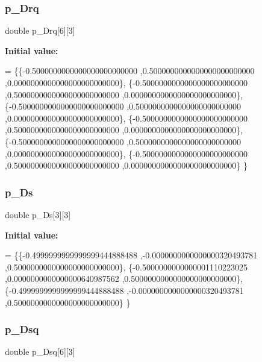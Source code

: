 \subsubsection{\texorpdfstring{p\+\_\+\+Drq}{p\_Drq}}
{\footnotesize\ttfamily double p\+\_\+\+Drq\mbox{[}6\mbox{]}\mbox{[}3\mbox{]}}

{\bfseries Initial value\+:}
\begin{DoxyCode}
= \{\{-0.5000000000000000000000000 ,0.5000000000000000000000000 ,0.0000000000000000000000000\},
\{-0.5000000000000000000000000 ,0.5000000000000000000000000 ,0.0000000000000000000000000\},
\{-0.5000000000000000000000000 ,0.5000000000000000000000000 ,0.0000000000000000000000000\},
\{-0.5000000000000000000000000 ,0.5000000000000000000000000 ,0.0000000000000000000000000\},
\{-0.5000000000000000000000000 ,0.5000000000000000000000000 ,0.0000000000000000000000000\},
\{-0.5000000000000000000000000 ,0.5000000000000000000000000 ,0.0000000000000000000000000\}
\}
\end{DoxyCode}
\mbox{\label{a00446_afe9c30056feb5271f416346c6ea6c40e}} 
\subsubsection{\texorpdfstring{p\+\_\+\+Ds}{p\_Ds}}
{\footnotesize\ttfamily double p\+\_\+\+Ds\mbox{[}3\mbox{]}\mbox{[}3\mbox{]}}

{\bfseries Initial value\+:}
\begin{DoxyCode}
= \{\{-0.4999999999999999444888488 ,-0.0000000000000000320493781 ,0.5000000000000000000000000\},
\{-0.5000000000000001110223025 ,0.0000000000000000640987562 ,0.5000000000000000000000000\},
\{-0.4999999999999999444888488 ,-0.0000000000000000320493781 ,0.5000000000000000000000000\}
\}
\end{DoxyCode}
\mbox{\label{a00446_a888bdab394fb5a93d4f69efe2aca2f25}} 
\subsubsection{\texorpdfstring{p\+\_\+\+Dsq}{p\_Dsq}}
{\footnotesize\ttfamily double p\+\_\+\+Dsq\mbox{[}6\mbox{]}\mbox{[}3\mbox{]}}

